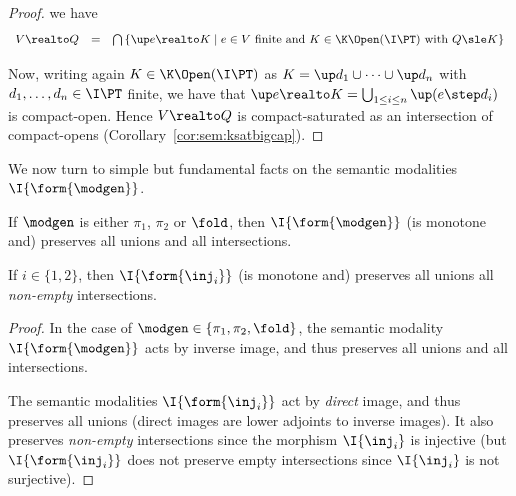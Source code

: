 \begin{proof}
\noindent
we have
\[
\begin{array}{l l l}
  V \realto Q
& =
& \bigcap
  \left\{
  \up e \realto K
  \mid
  \text{$e \in V$ finite and $K \in \K\Open(\I\PT)$ with $Q \sle K$}
  \right\}
\end{array}
\]

Now, writing again $K \in \K\Open(\I\PT)$
as $K = \up d_1 \cup \dots \cup \up d_n$
with $d_1,\dots,d_n \in \I\PT$ finite,
we have that $\up e \realto K = \bigcup_{1 \leq i \leq n}\up(e \step d_i)$
is compact-open.
Hence $V \realto Q$ is compact-saturated as an intersection of compact-opens
(Corollary~\ref{cor:sem:ksatbigcap}).
\end{proof}


We now turn to simple but fundamental facts
on the semantic modalities $\I{\form{\modgen}}$.

\begin{lemma}
\label{lem:proof:sem:log:mod}
If $\modgen$ is either $\pi_1$, $\pi_2$ or $\fold$,
then $\I{\form{\modgen}}$ (is monotone and) preserves all unions and all intersections.

If $i \in\{1,2\}$, then $\I{\form{\inj_i}}$
(is monotone and) preserves all unions all \emph{non-empty} intersections.
\end{lemma}

\begin{proof}
In the case of $\modgen \in \{\pi_1, \pi_2, \fold\}$,
the semantic modality $\I{\form{\modgen}}$ acts by inverse image,
and thus preserves all unions and all intersections.

The semantic modalities $\I{\form{\inj_i}}$ act by \emph{direct} image,
and thus preserves all unions
(direct images are lower adjoints to inverse images).
It also preserves \emph{non-empty} intersections since 
the morphism $\I{\inj_i}$ is injective
(but $\I{\form{\inj_i}}$ 
does not preserve empty intersections since $\I{\inj_i}$
is not surjective).
\end{proof}

